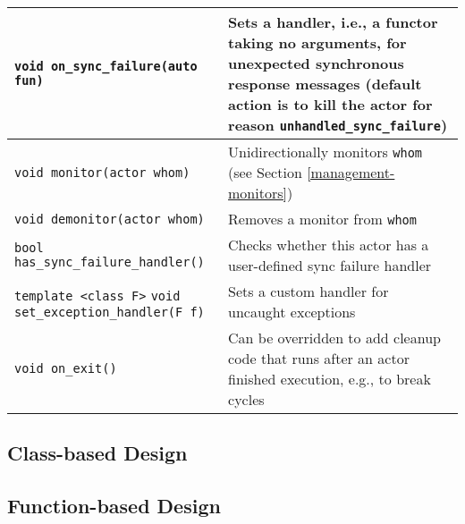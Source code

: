 {\begin{tabular*}{\textwidth}{m{}m{}}
  \hline
  \lstinline^void on_sync_failure(auto fun)^ & Sets a handler, i.e., a functor taking no arguments, for unexpected synchronous response messages (default action is to kill the actor for reason \lstinline^unhandled_sync_failure^) \\
  \hline
  \lstinline^void monitor(actor whom)^ & Unidirectionally monitors \lstinline^whom^ (see Section \ref{management-monitors}) \\
  \hline
  \lstinline^void demonitor(actor whom)^ & Removes a monitor from \lstinline^whom^ \\
  \hline
  \lstinline^bool has_sync_failure_handler()^ & Checks whether this actor has a user-defined sync failure handler \\
  \hline
  \lstinline^template <class F>^ \lstinline^void set_exception_handler(F f)^ & Sets a custom handler for uncaught exceptions \\
  \hline
  \lstinline^void on_exit()^ & Can be overridden to add cleanup code that runs after an actor finished execution, e.g., to break cycles \\
  \hline
\end{tabular*}
}

\subsection{Class-based Design}

\subsection{Function-based Design}
